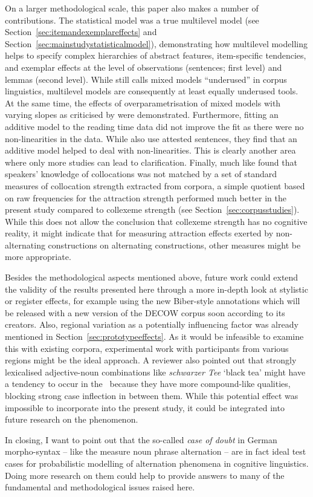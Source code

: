 On a larger methodological scale, this paper also makes a number of contributions.
The statistical model was a true multilevel model (see Section~\ref{sec:itemandexemplareffects} and Section~\ref{sec:mainstudystatisticalmodel}), demonstrating how multilevel modelling helps to specify complex hierarchies of abstract features, item-specific tendencies, and exemplar effects at the level of observations (sentences; first level) and lemmas (second level).
While \cite{Gries2015} still calls mixed models ``underused'' in corpus linguistics, multilevel models are consequently at least equally underused tools.
At the same time, the effects of overparametrisation of mixed models with varying slopes as criticised by \cite{BatesEa2015a} were demonstrated.
Furthermore, fitting an additive model to the reading time data did not improve the fit as there were no non-linearities in the data.
While \cite{DivjakEa2016} also use attested sentences, they find that an additive model helped to deal with non-linearities.
This is clearly another area where only more studies can lead to clarification.
Finally, much like \cite{Dabrowska2014} found that speakers' knowledge of collocations was not matched by a set of standard measures of collocation strength extracted from corpora, a simple quotient based on raw frequencies for the attraction strength performed much better in the present study compared to collexeme strength (see Section~\ref{sec:corpusstudies}).
While this does not allow the conclusion that collexeme strength has no cognitive reality, it might indicate that for measuring attraction effects exerted by non-alternating constructions on alternating constructions, other measures might be more appropriate.

Besides the methodological aspects mentioned above, future work could extend the validity of the results presented here through a more in-depth look at stylistic or register effects, for example using the new Biber-style annotations \citep{Biber1988} which will be released with a new version of the DECOW corpus soon according to its creators.
Also, regional variation as a potentially influencing factor was already mentioned in Section~\ref{sec:prototypeeffects}.
As it would be infeasible to examine this with existing corpora, experimental work with participants from various regions might be the ideal approach.
A reviewer also pointed out that strongly lexicalised adjective-noun combinations like \textit{schwarzer Tee} `black tea' might have a tendency to occur in the \NACa\ because they have more compound-like qualities, blocking strong case inflection in between them.
While this potential effect was impossible to incorporate into the present study, it could be integrated into future research on the phenomenon.

In closing, I want to point out that the so-called \textit{case of doubt} in German morpho-syntax -- like the measure noun phrase alternation -- are in fact ideal test cases for probabilistic modelling of alternation phenomena in cognitive linguistics.
Doing more research on them could help to provide answers to many of the fundamental and methodological issues raised here.
